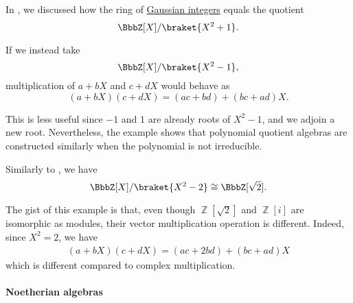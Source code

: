 \begin{example}\label{ex:integers_mod_xx_minus_1}
  In , we discussed how the ring of \hyperref[def:gaussian_integers]{Gaussian integers} equals the quotient
  \begin{equation*}
    \BbbZ[X] / \braket{ X^2 + 1 }.
  \end{equation*}

  If we instead take
  \begin{equation*}
    \BbbZ[X] / \braket{ X^2 - 1 },
  \end{equation*}
  multiplication of \( a + bX \) and \( c + dX \) would behave as
  \begin{equation*}
    (a + bX) (c + dX) = (ac + bd) + (bc + ad)X.
  \end{equation*}

  This is less useful since \( -1 \) and \( 1 \) are already roots of \( X^2 - 1 \), and we adjoin a new root. Nevertheless, the example shows that polynomial quotient algebras are constructed similarly when the polynomial is not irreducible.
\end{example}

\begin{example}\label{ex:integers_with_sqrt2}
  Similarly to , we have
  \begin{equation*}
    \BbbZ[X] / \braket{X^2 - 2} \cong \BbbZ[\sqrt 2].
  \end{equation*}

  The gist of this example is that, even though \( \BbbZ[\sqrt 2] \) and \( \BbbZ[i] \) are isomorphic as modules, their vector multiplication operation is different. Indeed, since \( X^2 = 2 \), we have
  \begin{align*}
    (a + bX) (c + dX) = (ac + 2bd) + (bc + ad)X
  \end{align*}
  which is different compared to complex multiplication.
\end{example}

\paragraph{Noetherian algebras}

